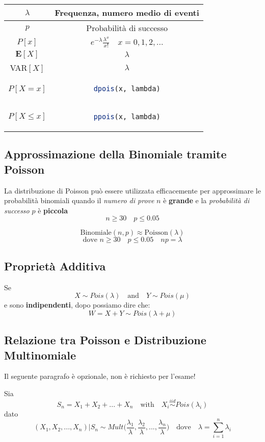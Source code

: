 \begingroup
\setlength{\tabcolsep}{10pt} %
\renewcommand{\arraystretch}{1.5} %
\begin{center}
\begin{tabular}{ |c|c| } 
\hline
\(\lambda\) & Frequenza, numero medio di eventi \\ \hline
\(p\) & Probabilità di successo \\ \hline
\(P[x]\) & $e^{-\lambda} \frac{\lambda^x}{x!} \quad x = 0,1,2,...$\\ \hline
\(\mathbf{E}[X]\) & \(\lambda\) \\ \hline
VAR\([X]\) & \(\lambda\) \\ \hline\hline
\(P[X = x]\) & \begin{lstlisting}[language=R]
dpois(x, lambda)
\end{lstlisting} \\ \hline
\(P[X \leq x]\) & \begin{lstlisting}[language=R]
ppois(x, lambda)
\end{lstlisting} \\ \hline
\end{tabular}
\end{center}
\endgroup


\subsection{Approssimazione della Binomiale tramite Poisson}
La distribuzione di Poisson può essere utilizzata efficacemente per approssimare le probabilità binomiali quando il \textit{numero di prove} \(n\) è \textbf{grande} e la \textit{probabilità di successo} \(p\) è \textbf{piccola}
\[n \geq 30 \quad p \leq 0.05\]

\[\text{Binomiale}(n,p) \approx \text{Poisson}(\lambda)\]
\[\text{dove } n \geq 30 \quad p \leq 0.05 \quad np=\lambda\]

\subsection{Proprietà Additiva}
Se
\[X \sim Pois(\lambda) \quad \text{and} \quad Y \sim Pois(\mu)\]
e sono \textbf{indipendenti}, dopo possiamo dire che:
\[W = X + Y \sim Pois(\lambda + \mu)\]

\subsection{Relazione tra Poisson e Distribuzione Multinomiale}
\begin{tcolorbox}[title=NOTA]
Il seguente paragrafo è opzionale, non è richiesto per l'esame!
\end{tcolorbox}
Sia 
\[S_n = X_1 + X_2 + ... + X_n \quad \text{with} \quad X_i\stackrel{iid}{\sim} Pois(\lambda_i)\]
dato
\[(X_1,X_2,...,X_n)|S_n \sim Mult\Big(\frac{\lambda_1}{\lambda},\frac{\lambda_2}{\lambda},...,\frac{\lambda_n}{\lambda}\Big) \quad \text{dove} \quad \lambda = \sum_{i = 1}^n \lambda_i\]